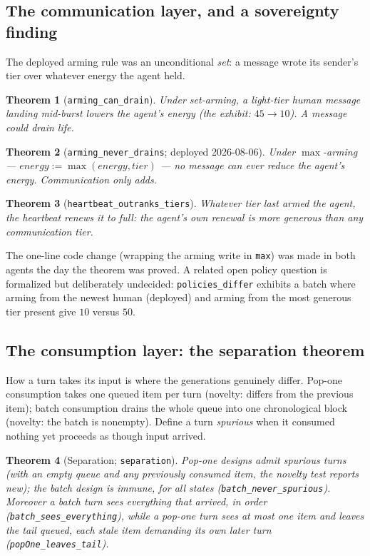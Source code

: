 \documentclass[11pt]{article}
\newtheorem{theorem}{Theorem}[section]
\newcommand{\lean}[1]{\texttt{#1}}
\newcommand{\code}[1]{\texttt{#1}}
\begin{document}
\subsection{The communication layer, and a sovereignty finding}

The deployed arming rule was an unconditional \emph{set}: a message
wrote its sender's tier over whatever energy the agent held.

\begin{theorem}[\lean{arming\_can\_drain}]
Under set-arming, a light-tier human message landing mid-burst lowers
the agent's energy (the exhibit: $45 \to 10$). A message could
\emph{drain} life.
\end{theorem}

\begin{theorem}[\lean{arming\_never\_drains}; deployed 2026-08-06]
Under $\max$-arming --- $\mathit{energy} \mathrel{:=}
\max(\mathit{energy}, \mathit{tier})$ --- no message can ever reduce the
agent's energy. Communication only adds.
\end{theorem}

\begin{theorem}[\lean{heartbeat\_outranks\_tiers}]
Whatever tier last armed the agent, the heartbeat renews it to
\emph{full}: the agent's own renewal is more generous than any
communication tier.
\end{theorem}

The one-line code change (wrapping the arming write in \code{max}) was
made in both agents the day the theorem was proved. A related open
policy question is formalized but deliberately undecided:
\lean{policies\_differ} exhibits a batch where arming from the newest
human (deployed) and arming from the most generous tier present give
$10$ versus $50$.

\subsection{The consumption layer: the separation theorem}

How a turn takes its input is where the generations genuinely differ.
Pop-one consumption takes one queued item per turn (novelty: differs
from the previous item); batch consumption drains the whole queue into
one chronological block (novelty: the batch is nonempty). Define a turn
\emph{spurious} when it consumed nothing yet proceeds as though input
arrived.

\begin{theorem}[Separation; \lean{separation}]
Pop-one designs admit spurious turns (with an empty queue and any
previously consumed item, the novelty test reports new); the batch
design is immune, for all states
(\lean{batch\_never\_spurious}). Moreover a batch turn sees everything
that arrived, in order (\lean{batch\_sees\_everything}), while a pop-one
turn sees at most one item and leaves the tail queued, each stale item
demanding its own later turn (\lean{popOne\_leaves\_tail}).
\end{theorem}
\end{document}

